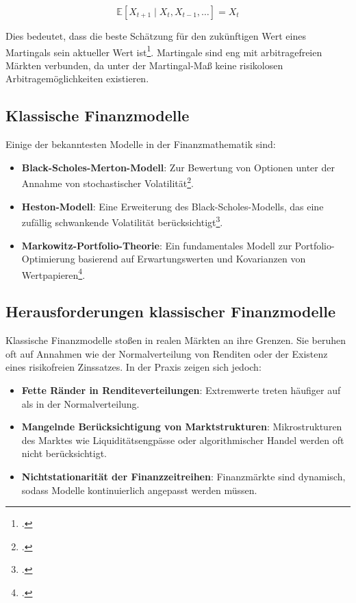 \begin{equation}
	\mathbb{E}[X_{t+1} \mid X_t, X_{t-1}, \dots] = X_t
\end{equation}

Dies bedeutet, dass die beste Schätzung für den zukünftigen Wert eines Martingals sein aktueller Wert ist\footcite{FollmerSchied2016}. Martingale sind eng mit arbitragefreien Märkten verbunden, da unter der Martingal-Maß keine risikolosen Arbitragemöglichkeiten existieren.

\subsection{Klassische Finanzmodelle}
Einige der bekanntesten Modelle in der Finanzmathematik sind:

\begin{itemize}
	\item \textbf{Black-Scholes-Merton-Modell}: Zur Bewertung von Optionen unter der Annahme von stochastischer Volatilität\footcite{BlackScholes1973}.
	\item \textbf{Heston-Modell}: Eine Erweiterung des Black-Scholes-Modells, das eine zufällig schwankende Volatilität berücksichtigt\footcite{Heston1993}.
	\item \textbf{Markowitz-Portfolio-Theorie}: Ein fundamentales Modell zur Portfolio-Optimierung basierend auf Erwartungswerten und Kovarianzen von Wertpapieren\footcite{Markowitz1952}.
\end{itemize}

\subsection{Herausforderungen klassischer Finanzmodelle}
Klassische Finanzmodelle stoßen in realen Märkten an ihre Grenzen. Sie beruhen oft auf Annahmen wie der Normalverteilung von Renditen oder der Existenz eines risikofreien Zinssatzes. In der Praxis zeigen sich jedoch:

\begin{itemize}
	\item \textbf{Fette Ränder in Renditeverteilungen}: Extremwerte treten häufiger auf als in der Normalverteilung.
	\item \textbf{Mangelnde Berücksichtigung von Marktstrukturen}: Mikrostrukturen des Marktes wie Liquiditätsengpässe oder algorithmischer Handel werden oft nicht berücksichtigt.
	\item \textbf{Nichtstationarität der Finanzzeitreihen}: Finanzmärkte sind dynamisch, sodass Modelle kontinuierlich angepasst werden müssen.
\end{itemize}
